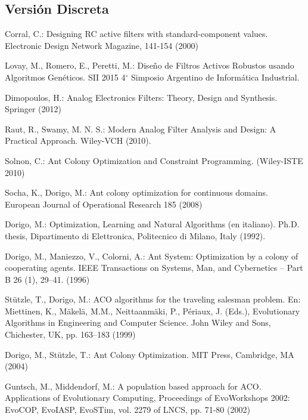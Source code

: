 \documentclass{llncs}
\begin{document}
	\subsection{Versión Discreta}
	\label{subsec:pythondiscreto}
	
  \begin{thebibliography}{1}
      Corral, C.: 
      Designing RC active filters with standard-component values. Electronic Design
      Network Magazine, 141-154 (2000)
      
      Lovay, M., Romero, E., Peretti, M.:
      Diseño de Filtros Activos Robustos usando Algoritmos Genéticos.
      SII 2015 4$^\circ$ Simposio Argentino de Informática Industrial.
      
      Dimopoulos, H.: 
      Analog Electronics Filters: Theory, Design and Synthesis. 
      Springer (2012)
      
      Raut, R., Swamy, M. N. S.: 
      Modern Analog Filter Analysis and Design: A Practical Approach. 
      Wiley-VCH (2010).
      
      Solnon, C.:
      Ant Colony Optimization and Constraint Programming. (Wiley-ISTE 2010) 
      
      Socha, K., Dorigo, M.:
      Ant colony optimization for continuous domains.
      European Journal of Operational Research 185 (2008)
      
      Dorigo, M.:
      Optimization, Learning and Natural Algorithms (en italiano). 
      Ph.D. thesis, Dipartimento di Elettronica, Politecnico di Milano, Italy (1992).
      
      Dorigo, M., Maniezzo, V., Colorni, A.: 
      Ant System: Optimization by a colony of cooperating agents. 
      IEEE Transactions on Systems, Man, and Cybernetics – Part B 26 (1), 29–41. (1996)
      
      Stützle, T., Dorigo, M.:
      ACO algorithms for the traveling salesman problem. 
      En: Miettinen, K., Mäkelä, M.M., Neittaanmäki, P., Périaux, J. (Eds.), Evolutionary Algorithms in
	  Engineering and Computer Science. John Wiley and Sons,
	  Chichester, UK, pp. 163–183 (1999)

	 Dorigo, M., Stützle, T.: 
	 Ant Colony Optimization. 
	 MIT Press, Cambridge, MA (2004)
	 
	 Guntsch, M., Middendorf, M.:
	 A population based approach for ACO.
	 Applications of Evolutionary Computing, Proceedings of EvoWorkshops 2002:
	 EvoCOP, EvoIASP, EvoSTim, vol. 2279 of LNCS, pp. 71-80 (2002)
      

\end{thebibliography}
\end{document}
